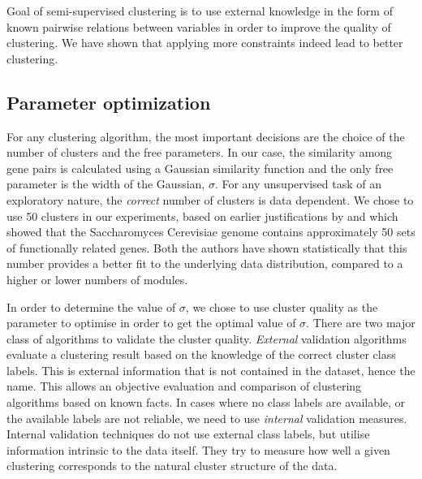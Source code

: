 \begin{figure}[p]
\centering
{}
\label{fig:spirals_cv}
\caption[Spirals dataset clustering quality improvement with increasing number of known constraints]{}
\end{figure}

Goal of semi-supervised clustering is to use external knowledge in the form of known pairwise relations between variables in order to improve the quality of clustering. We have shown that applying more constraints indeed lead to better clustering.

\subsection{Parameter optimization} \label{chap2:sec:param_opt}
For any clustering algorithm, the most important decisions are the choice of the number of clusters and the free parameters. In our case, the similarity among gene pairs is calculated using a Gaussian similarity function and the only free parameter is the width of the Gaussian, $\sigma$. For any unsupervised task of an exploratory nature, the \textit{correct} number of clusters is data dependent. We chose to use 50 clusters in our experiments, based on earlier justifications by \citet{ihmels02revealing} and \citet{segal03module} which showed that the Saccharomyces Cerevisiae genome contains approximately 50 sets of functionally related genes. Both the authors have shown statistically that this number provides a better fit to the underlying data distribution, compared to a higher or lower numbers of modules.

In order to determine the value of $\sigma$, we chose to use cluster quality as the parameter to optimise in order to get the optimal value of $\sigma$. There are two major class of algorithms 
to validate the cluster quality. \textit{External} validation algorithms evaluate a clustering result based on the knowledge of the correct 
cluster class labels. This is external information that is not contained in the dataset, hence the name. This allows an objective evaluation and comparison of clustering algorithms based on known facts. In cases where no class labels are available, or the available labels are not reliable, 
we need to use \textit{internal} validation measures. Internal validation techniques do not use external class labels, but utilise information intrinsic to the data itself. They try to measure how well a given 
clustering corresponds to the natural cluster structure of the data.


